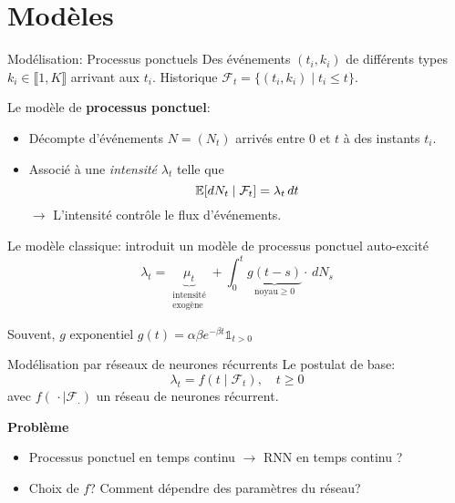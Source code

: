 \documentclass[../main.tex]{subfiles}
\begin{document}
\section{Modèles}

\begin{frame}{Modélisation: Processus ponctuels}
Des événements $(t_i, k_i)$ de différents types $k_i\in\llbracket 1, K\rrbracket$ arrivant aux $t_i$. Historique $\mathcal{F}_t = \{(t_i, k_i)\mid t_i \leq t\}$.\pause

Le modèle de \textbf{processus ponctuel}:
\begin{itemize}
	\item[\textbullet] Décompte d'événements $N = (N_t)$ arrivés entre $0$ et $t$ à des instants $t_i$.
	\item[\textbullet] Associé à une \textit{intensité} $\lambda_t$ telle que
	\[
	\mathbb{E}[dN_t\mid \mathcal{F}_t] = \lambda_t\,dt
	\]\pause
	$\rightarrow$ L'intensité contrôle le flux d'événements.
\end{itemize}

\end{frame}

\begin{frame}{Le modèle classique: \parencite{hawkes1971}}
\citeauthor{hawkes1971} introduit un modèle de processus ponctuel auto-excité
\begin{equation}
	\lambda_t =
	\underbrace{\mu_t}_{\substack{\text{intensité}\\\text{exogène}}} + \int_0^t \underbrace{g(t-s)}_{\text{noyau}\geq 0}\cdot\, dN_s
\end{equation}

Souvent, $g$ exponentiel $g(t) = \alpha\beta e^{-\beta t} \mathds{1}_{t > 0}$
\end{frame}


\begin{frame}{Modélisation par réseaux de neurones récurrents}
Le postulat de base:
\begin{equation}
	\lambda_t = f(t\mid \mathcal{F}_t),\quad t \geq 0
\end{equation}
avec $f(\,\cdot \mid \mathcal{F_{.}})$ un réseau de neurones récurrent.\pause

\noindent\textbf{Problème} \begin{itemize}
\item Processus ponctuel en temps continu $\rightarrow$ RNN en temps continu ?
\item Choix de $f$? Comment dépendre des paramètres du réseau?
\end{itemize}

\end{frame}
\end{document}
